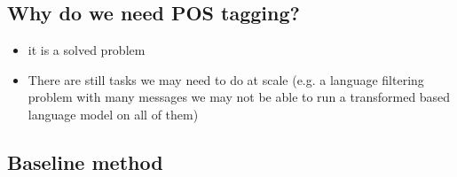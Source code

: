 \documentclass[11pt]{article}
\begin{document}
\subsection{Why do we need POS tagging?}

\begin{minipage}[l]{.5\linewidth}
    \begin{figure}[H]
        \centering
    \end{figure}    
\end{minipage}\hfill
\begin{minipage}[r]{.48\linewidth}
    \begin{itemize}
        \item it is a solved problem
        \item There are still tasks we may need to do at scale (e.g. a language filtering problem with many messages we may not be able to run a transformed based language model on all of them)
    \end{itemize}
\end{minipage}

\subsection{Baseline method}
\end{document}
